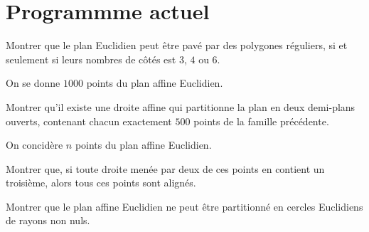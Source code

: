 \section{Programmme actuel}

\begin{exer}
Montrer que le plan Euclidien peut être pavé par des polygones réguliers, %
si et seulement si leurs nombres de côtés est $3$, $4$ ou $6$.
\end{exer}

\begin{exer}
On se donne $1000$ points du plan affine Euclidien.

Montrer qu'il existe une droite affine qui partitionne la plan en deux demi-plans ouverts, %
contenant chacun exactement $500$ points de la famille précédente.
\end{exer}

\begin{exer}
On concidère $n$ points du plan affine Euclidien.

Montrer que, si toute droite menée par deux de ces points en contient un troisième, alors tous ces points sont alignés.
\end{exer}

\begin{exer}
Montrer que le plan affine Euclidien ne peut être partitionné en cercles Euclidiens de rayons non nuls.
\end{exer}